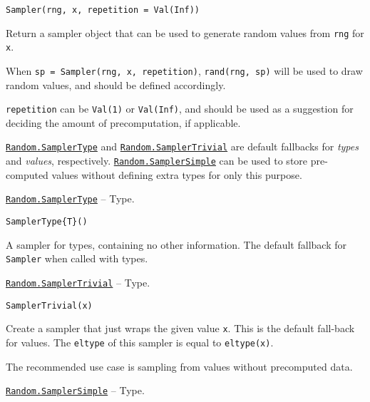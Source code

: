 \begin{adjustwidth}{2em}{0pt}


\begin{verbatim}
Sampler(rng, x, repetition = Val(Inf))
\end{verbatim}

Return a sampler object that can be used to generate random values from \texttt{rng} for \texttt{x}.

When \texttt{sp = Sampler(rng, x, repetition)}, \texttt{rand(rng, sp)} will be used to draw random values, and should be defined accordingly.

\texttt{repetition} can be \texttt{Val(1)} or \texttt{Val(Inf)}, and should be used as a suggestion for deciding the amount of precomputation, if applicable.

\hyperlink{2169729397706095790}{\texttt{Random.SamplerType}} and \hyperlink{2575204551890994411}{\texttt{Random.SamplerTrivial}} are default fallbacks for \emph{types} and \emph{values}, respectively. \hyperlink{17949645161476858061}{\texttt{Random.SamplerSimple}} can be used to store pre-computed values without defining extra types for only this purpose.



\end{adjustwidth}
\hypertarget{2169729397706095790}{} 
\hyperlink{2169729397706095790}{\texttt{Random.SamplerType}}  -- {Type.}

\begin{adjustwidth}{2em}{0pt}


\begin{verbatim}
SamplerType{T}()
\end{verbatim}

A sampler for types, containing no other information. The default fallback for \texttt{Sampler} when called with types.



\end{adjustwidth}
\hypertarget{2575204551890994411}{} 
\hyperlink{2575204551890994411}{\texttt{Random.SamplerTrivial}}  -- {Type.}

\begin{adjustwidth}{2em}{0pt}


\begin{verbatim}
SamplerTrivial(x)
\end{verbatim}

Create a sampler that just wraps the given value \texttt{x}. This is the default fall-back for values. The \texttt{eltype} of this sampler is equal to \texttt{eltype(x)}.

The recommended use case is sampling from values without precomputed data.



\end{adjustwidth}
\hypertarget{17949645161476858061}{} 
\hyperlink{17949645161476858061}{\texttt{Random.SamplerSimple}}  -- {Type.}

